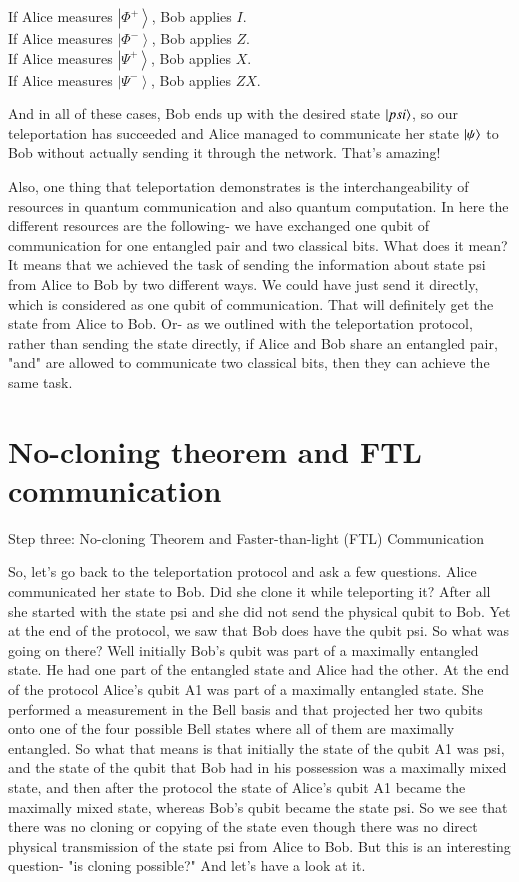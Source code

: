 If Alice measures $\left|\Phi^{+}\right\rangle$, Bob applies $I$.\\
If Alice measures $\left|\Phi^{-}\right\rangle$, Bob applies $Z$.\\
If Alice measures $\left|\Psi^{+}\right\rangle$, Bob applies $X$.\\
If Alice measures $\left|\Psi^{-}\right\rangle$, Bob applies $Z X$.

And in all of these cases, Bob ends up with the desired state $\ket{psi}$, so our teleportation has succeeded and Alice managed to communicate her state $\ket{\psi}$ to Bob without actually sending it through the network. That's amazing!

Also, one thing that teleportation demonstrates is the interchangeability of resources in quantum communication and also quantum computation. In here the different resources are the following- we have exchanged one qubit of communication for one entangled pair and two classical bits. What does it mean? It means that we achieved the task of sending the information about state psi from Alice to Bob by two different ways. We could have just send it directly, which is considered as one qubit of communication. That will definitely get the state from Alice to Bob. Or- as we outlined with the teleportation protocol, rather than sending the state directly, if Alice and Bob share an entangled pair, "and" are allowed to communicate two classical bits, then they can achieve the same task.

\section{No-cloning theorem and FTL communication}

Step three: No-cloning Theorem and Faster-than-light (FTL) Communication

So, let's go back to the teleportation protocol and ask a few questions. Alice communicated her state to Bob. Did she clone it while teleporting it? After all she started with the state psi and she did not send the physical qubit to Bob. Yet at the end of the protocol, we saw that Bob does have the qubit psi. So what was going on there? Well initially Bob's qubit was part of a maximally entangled state. He had one part of the entangled state and Alice had the other. At the end of the protocol Alice's qubit A1 was part of a maximally entangled state. She performed a measurement in the Bell basis and that projected her two qubits onto one of the four possible Bell states where all of them are maximally entangled. So what that means is that initially the state of the qubit A1 was psi, and the state of the qubit that Bob had in his possession was a maximally mixed state, and then after the protocol the state of Alice's qubit A1 became the maximally mixed state, whereas Bob's qubit became the state psi. So we see that there was no cloning or copying of the state even though there was no direct physical transmission of the state psi from Alice to Bob. But this is an interesting question- "is cloning possible?" And let's have a look at it.

